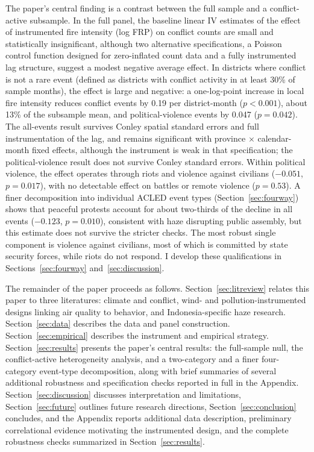 \documentclass[12pt]{article}
\begin{document}
The paper's central finding is a contrast between the full sample and a conflict-active subsample. In the full panel, the baseline linear IV estimates of the effect of instrumented fire intensity (log FRP) on conflict counts are small and statistically insignificant, although two alternative specifications, a Poisson control function designed for zero-inflated count data \citep[following][]{lu2023fish} and a fully instrumented lag structure, suggest a modest negative average effect. In districts where conflict is not a rare event (defined as districts with conflict activity in at least 30\% of sample months), the effect is large and negative: a one-log-point increase in local fire intensity reduces conflict events by 0.19 per district-month ($p<0.001$), about 13\% of the subsample mean, and political-violence events by 0.047 ($p=0.042$). The all-events result survives Conley spatial standard errors and full instrumentation of the lag, and remains significant with province $\times$ calendar-month fixed effects, although the instrument is weak in that specification; the political-violence result does not survive Conley standard errors. Within political violence, the effect operates through riots and violence against civilians ($-0.051$, $p=0.017$), with no detectable effect on battles or remote violence ($p=0.53$). A finer decomposition into individual ACLED event types (Section~\ref{sec:fourway}) shows that peaceful protests account for about two-thirds of the decline in all events ($-0.123$, $p=0.010$), consistent with haze disrupting public assembly, but this estimate does not survive the stricter checks. The most robust single component is violence against civilians, most of which is committed by state security forces, while riots do not respond. I develop these qualifications in Sections~\ref{sec:fourway} and~\ref{sec:discussion}.

The remainder of the paper proceeds as follows. Section~\ref{sec:litreview} relates this paper to three literatures: climate and conflict, wind- and pollution-instrumented designs linking air quality to behavior, and Indonesia-specific haze research. Section~\ref{sec:data} describes the data and panel construction. Section~\ref{sec:empirical} describes the instrument and empirical strategy. Section~\ref{sec:results} presents the paper's central results: the full-sample null, the conflict-active heterogeneity analysis, and a two-category and a finer four-category event-type decomposition, along with brief summaries of several additional robustness and specification checks reported in full in the Appendix. Section~\ref{sec:discussion} discusses interpretation and limitations, Section~\ref{sec:future} outlines future research directions, Section~\ref{sec:conclusion} concludes, and the Appendix reports additional data description, preliminary correlational evidence motivating the instrumented design, and the complete robustness checks summarized in Section~\ref{sec:results}.
\end{document}
